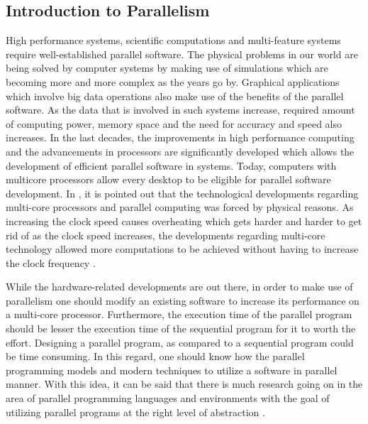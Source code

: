 \subsection{Introduction to Parallelism} 
High performance systems, scientific computations and multi-feature systems require well-established parallel software. The physical problems in our world are being solved by computer systems by making use of simulations which are becoming more and more complex as the years go by. Graphical applications which involve big data operations also make use of the benefits of the parallel software. As the data that is involved in such systems increase, required amount of computing power, memory space and the need for accuracy and speed also increases. In the last decades, the improvements in high performance computing and the advancements in processors are significantly developed which allows the development of efficient parallel software in systems. Today, computers with multicore processors allow every desktop to be eligible for parallel software development. In \cite{springerparallel}, it is pointed out that the technological developments regarding multi-core processors and parallel computing was forced by physical reasons. As increasing the clock speed causes overheating which gets harder and harder to get rid of as the clock speed increases, the developments regarding multi-core technology allowed more computations to be achieved without having to increase the clock frequency \cite{springerparallel}.

While the hardware-related developments are out there, in order to make use of parallelism one should modify an existing software to increase its performance on a multi-core processor. Furthermore, the execution time of the parallel program should be lesser the execution time of the sequential program for it to worth the effort. Designing a parallel program, as compared to a sequential program could be time consuming. In this regard, one should know how the parallel programming models and modern techniques to utilize a software in parallel manner. With this idea, it can be said that there is much research going on in the area of parallel programming languages and environments with the goal of utilizing parallel programs at the right level of abstraction \cite{springerparallel}.

